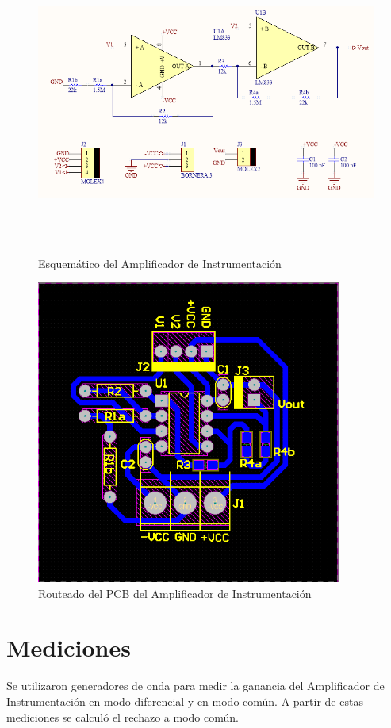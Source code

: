 \begin{figure}[ht]
\begin{center}
\includegraphics[height=10cm]{res/altium/sch.png}
\caption{Esquemático del Amplificador de Instrumentación}
\label{e4:fig_pcb_sch}
\end{center}
\end{figure}

\begin{figure}[ht]
\begin{center}
\includegraphics[height=10cm]{res/altium/pcb.png}
\caption{Routeado del PCB del Amplificador de Instrumentación}
\label{e4:fig_pcb_route}
\end{center}
\end{figure}

\section{Mediciones}
Se utilizaron generadores de onda para medir la ganancia del Amplificador de Instrumentación en modo diferencial y en modo común. A partir de estas mediciones se calculó el rechazo a modo común.